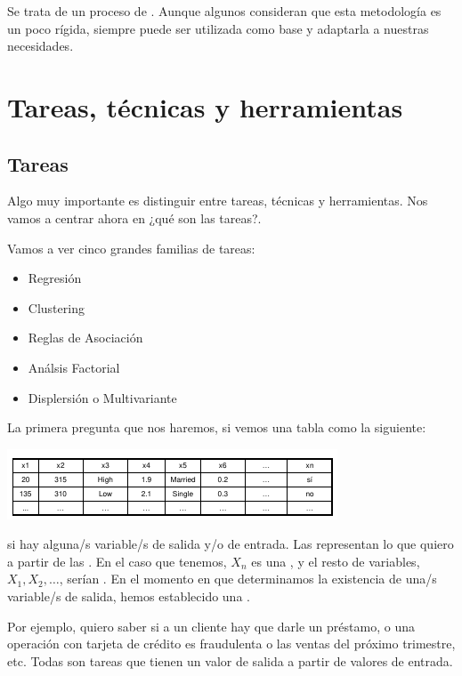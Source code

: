 Se trata de un proceso de . Aunque algunos consideran que esta metodología es un poco rígida, siempre puede ser utilizada como base y adaptarla a nuestras necesidades.

\section{Tareas, técnicas y herramientas}

\subsection{Tareas}

Algo muy importante es distinguir entre tareas, técnicas y herramientas. Nos vamos a centrar ahora en ¿qué son las tareas?.

Vamos a ver cinco grandes familias de tareas:
\begin{itemize}
    \item Regresión 
    \item Clustering 
    \item Reglas de Asociación 
    \item Análsis Factorial
    \item Displersión o Multivariante
\end{itemize}

La primera pregunta que nos haremos, si vemos una tabla como la siguiente:
\begin{center}
    \includegraphics[scale=.85]{images/mod01-18.png}
\end{center}
si hay alguna/s variable/s de salida y/o de entrada. Las  representan lo que quiero  a partir de las . En el caso que tenemos, $X_n$ es una , y el resto de variables, $X_1,X_2,\ldots$, serían . En el momento en que determinamos la existencia de una/s variable/s de salida, hemos establecido una .

Por ejemplo, quiero saber si a un cliente hay que darle un préstamo, o una operación con tarjeta de crédito es fraudulenta o las ventas del próximo trimestre, etc. Todas son tareas que tienen un valor de salida a partir de valores de entrada.


